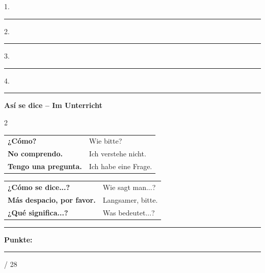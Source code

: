 \documentclass[10pt, a4paper]{article}
\newcommand{\sanstext}[1]{{\fontfamily{phv}\selectfont #1}}
\newcommand{\maxpunkte}{28}
\newcommand{\es}[1]{\textbf{#1}}
\newcommand{\luecke}[1]{\rule{#1}{0.4pt}}
\begin{document}
\vspace{6pt}

1. \luecke{14cm}

\vspace{8pt}

2. \luecke{14cm}

\vspace{8pt}

3. \luecke{14cm}

\vspace{8pt}

4. \luecke{14cm}


\vspace{8pt}

\begin{merkbox}
\sanstext{\textbf{Así se dice – Im Unterricht}}

\vspace{3pt}

\begin{multicols}{2}

{\small
\begin{tabular}{@{}ll@{}}
\es{¿Cómo?} & Wie bitte? \\
\es{No comprendo.} & Ich verstehe nicht. \\
\es{Tengo una pregunta.} & Ich habe eine Frage. \\
\end{tabular}}

\columnbreak

{\small
\begin{tabular}{@{}ll@{}}
\es{¿Cómo se dice...?} & Wie sagt man...? \\
\es{Más despacio, por favor.} & Langsamer, bitte. \\
\es{¿Qué significa...?} & Was bedeutet...? \\
\end{tabular}}

\end{multicols}
\end{merkbox}


\vfill

\noindent\rule{\textwidth}{0.5pt}

\vspace{4pt}

\hfill\sanstext{\textbf{Punkte:}} \luecke{1.2cm} / \maxpunkte
\end{document}
